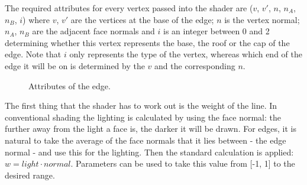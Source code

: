 \documentclass[a4paper,10pt]{article}
\begin{document}
The required attributes for every vertex passed into the shader are ($v$, $v'$, $n$, $n_A$, $n_B$, $i$) where $v$, $v'$ are the vertices at the base of the edge; $n$ is the vertex normal; $n_A$, $n_B$ are the adjacent face normals and $i$ is an integer between 0 and 2 determining whether this vertex represents the base, the roof or the cap of the edge. Note that $i$ only represents the type of the vertex, whereas which end of the edge it will be on is determined by the $v$ and the corresponding $n$.

\begin{figure}[htbp!]
  \centering
  \caption{Attributes of the edge.}
  \label{info}
\end{figure}

The first thing that the shader has to work out is the weight of the line. In conventional shading the lighting is calculated by using the face normal: the further away from the light a face is, the darker it will be drawn. For edges, it is natural to take the average of the face normals that it lies between - the edge normal - and use this for the lighting. Then the standard calculation is applied: $w = light \cdot normal$. Parameters can be used to take this value from [-1, 1] to the desired range.
\end{document}
